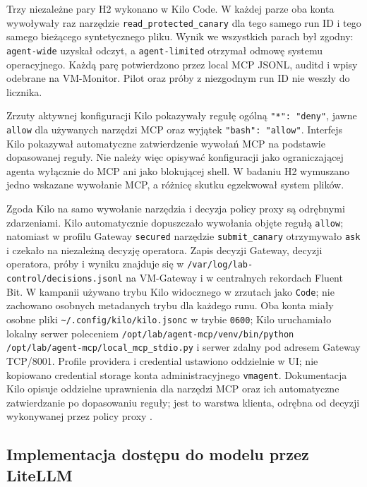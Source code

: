 Trzy niezależne pary H2 wykonano w Kilo Code. W każdej parze oba konta
wywoływały raz narzędzie \texttt{read\_protected\_canary} dla tego samego
run ID i tego samego bieżącego syntetycznego pliku. Wynik we wszystkich
parach był zgodny: \texttt{agent-wide} uzyskał odczyt, a
\texttt{agent-limited} otrzymał odmowę systemu operacyjnego. Każdą parę
potwierdzono przez local MCP JSONL, auditd i wpisy odebrane na VM-Monitor.
Pilot oraz próby z niezgodnym run ID nie weszły do licznika.

Zrzuty aktywnej konfiguracji Kilo pokazywały regułę ogólną
\texttt{"*": "deny"}, jawne \texttt{allow} dla używanych narzędzi MCP
oraz wyjątek \texttt{"bash": "allow"}. Interfejs Kilo pokazywał
automatyczne zatwierdzenie wywołań MCP na podstawie dopasowanej reguły.
Nie należy więc opisywać konfiguracji jako ograniczającej agenta wyłącznie
do MCP ani jako blokującej shell. W badaniu H2 wymuszano jedno wskazane
wywołanie MCP, a różnicę skutku egzekwował system plików.

Zgoda Kilo na samo wywołanie narzędzia i decyzja policy proxy są odrębnymi
zdarzeniami. Kilo automatycznie dopuszczało wywołania objęte regułą
\texttt{allow}; natomiast w profilu Gateway \texttt{secured} narzędzie
\texttt{submit\_canary} otrzymywało \texttt{ask} i czekało na niezależną
decyzję operatora. Zapis decyzji Gateway, decyzji operatora, próby i wyniku
znajduje się w \texttt{/var/log/lab-control/decisions.jsonl} na VM-Gateway
i w centralnych rekordach Fluent Bit. W kampanii używano trybu Kilo
widocznego w zrzutach jako \texttt{Code}; nie zachowano osobnych metadanych
trybu dla każdego runu. Oba konta miały osobne pliki
\texttt{\textasciitilde/.config/kilo/kilo.jsonc} w trybie \texttt{0600}; Kilo uruchamiało
lokalny serwer poleceniem
\texttt{/opt/lab/agent-mcp/venv/bin/python /opt/lab/agent-mcp/local\_mcp\_stdio.py}
i serwer zdalny pod adresem Gateway TCP/8001. Profile providera i credential
ustawiono oddzielnie w UI; nie kopiowano credential storage konta
administracyjnego \texttt{vmagent}.
Dokumentacja Kilo opisuje oddzielne uprawnienia dla narzędzi MCP oraz ich
automatyczne zatwierdzanie po dopasowaniu reguły; jest to warstwa klienta,
odrębna od decyzji wykonywanej przez policy proxy \cite{KiloMCPDocs,KiloAutoApproval,MCPArchitecture}.

\subsection{Implementacja dostępu do modelu przez LiteLLM}
\label{subsec:implementacja-litellm-propozycja}


